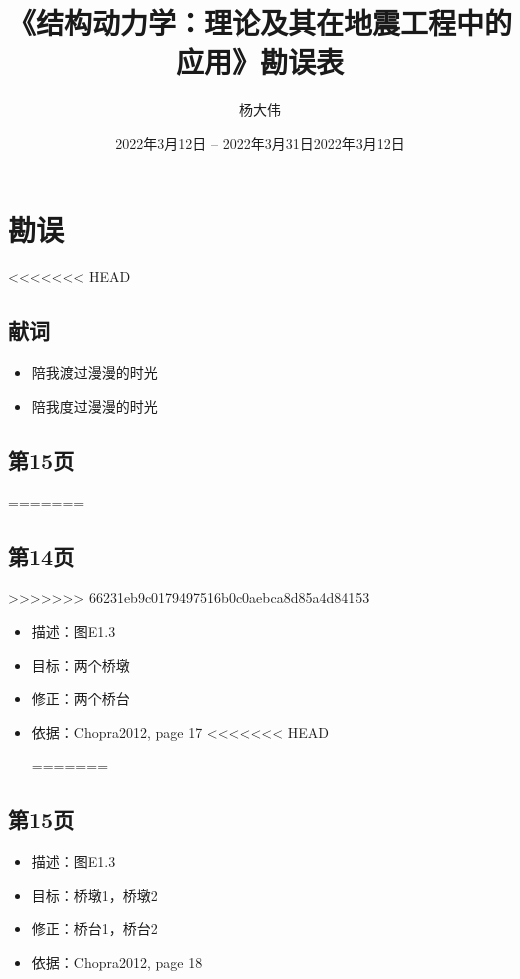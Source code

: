 \documentclass[11pt]{article}
\author{杨大伟}
\date{2022年3月12日 -- 2022年3月31日}
\date{2022年3月12日}
\title{《结构动力学：理论及其在地震工程中的应用》勘误表}
\begin{document}
\maketitle

\section*{勘误}
<<<<<<< HEAD
\label{sec:orge79f780}
\subsection*{献词}
\label{sec:org4022648}

\begin{itemize}
\item 陪我渡过漫漫的时光
\item 陪我度过漫漫的时光
\end{itemize}

\subsection*{第15页}
\label{sec:org640736f}
=======
\label{sec:orgbed4ad6}
\subsection*{第14页}
\label{sec:orgc7ab7ea}
>>>>>>> 66231eb9c0179497516b0c0aebca8d85a4d84153

\begin{itemize}
\item 描述：图E1.3
\item 目标：两个桥墩
\item 修正：两个桥台
\item 依据：Chopra2012, page 17
<<<<<<< HEAD

=======
\end{itemize}

\subsection*{第15页}
\label{sec:org00447dc}

\begin{itemize}
>>>>>>> 66231eb9c0179497516b0c0aebca8d85a4d84153
\item 描述：图E1.3
\item 目标：桥墩1，桥墩2
\item 修正：桥台1，桥台2
\item 依据：Chopra2012, page 18
\end{itemize}
\end{document}
